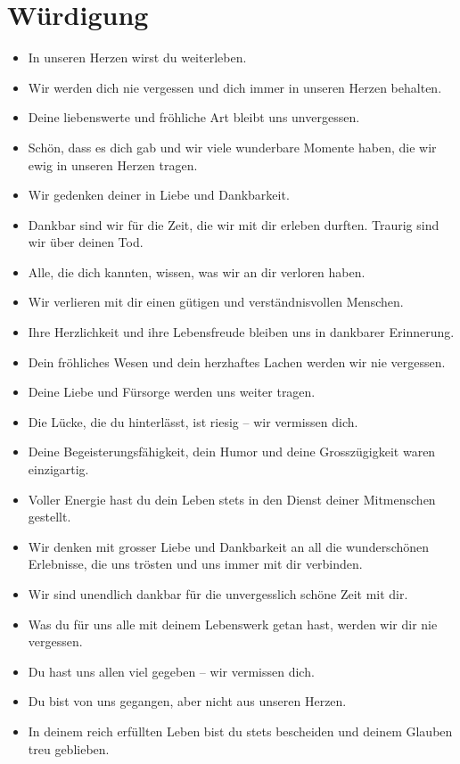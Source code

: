 \documentclass[ngerman,a4paper,11pt]{scrreprt}
\begin{document}
\section{Würdigung}
\label{sec-1-1-7}

\begin{itemize}
\item In unseren Herzen wirst du weiterleben.
\item Wir werden dich nie vergessen und dich immer in unseren Herzen behalten.
\item Deine liebenswerte und fröhliche Art bleibt uns unvergessen.
\item Schön, dass es dich gab und wir viele wunderbare Momente haben, die wir
ewig in unseren Herzen tragen.
\item Wir gedenken deiner in Liebe und Dankbarkeit.
\item Dankbar sind wir für die Zeit, die wir mit dir erleben durften. Traurig
sind wir über deinen Tod.
\item Alle, die dich kannten, wissen, was wir an dir verloren haben.
\item Wir verlieren mit dir einen gütigen und verständnisvollen Menschen.
\item Ihre Herzlichkeit und ihre Lebensfreude bleiben uns in dankbarer
Erinnerung.
\item Dein fröhliches Wesen und dein herzhaftes Lachen werden wir nie
vergessen.
\item Deine Liebe und Fürsorge werden uns weiter tragen.
\item Die Lücke, die du hinterlässt, ist riesig -- wir vermissen dich.
\item Deine Begeisterungsfähigkeit, dein Humor und deine Grosszügigkeit waren
einzigartig.
\item Voller Energie hast du dein Leben stets in den Dienst deiner Mitmenschen
gestellt.
\item Wir denken mit grosser Liebe und Dankbarkeit an all die wunderschönen
Erlebnisse, die uns trösten und uns immer mit dir verbinden.
\item Wir sind unendlich dankbar für die unvergesslich schöne Zeit mit dir.
\item Was du für uns alle mit deinem Lebenswerk getan hast, werden wir dir nie
vergessen.
\item Du hast uns allen viel gegeben -- wir vermissen dich.
\item Du bist von uns gegangen, aber nicht aus unseren Herzen.
\item In deinem reich erfüllten Leben bist du stets bescheiden und deinem
Glauben treu geblieben.
\end{itemize}
\end{document}
